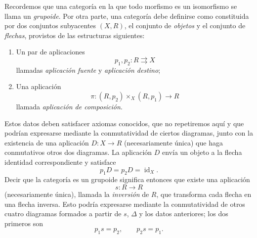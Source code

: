 Recordemos que una categoría en la que todo morfismo es un isomorfismo se
llama un \emph{grupoide}. Por otra parte, una categoría debe definirse como
constituida por dos conjuntos subyacentes $(X,R)$, el conjunto de
\emph{objetos} y el conjunto de \emph{flechas}, provistos de las estructuras
siguientes:
\begin{enumerate}
\item[(i)] Un par de aplicaciones
\[
  p_1,p_2:R\rightrightarrows X
\]
llamadas \emph{aplicación fuente} y \emph{aplicación destino};

\item[(ii)] Una aplicación
\[
  \pi:(R,p_2)\times_X(R,p_1)\longrightarrow R
\]
llamada \emph{aplicación de composición}.
\end{enumerate}
Estos datos deben satisfacer axiomas conocidos, que no repetiremos aquí y que
podrían expresarse mediante la conmutatividad de ciertos diagramas, junto con
la existencia de una aplicación $D:X\to R$ (necesariamente única) que haga
conmutativos otros dos diagramas. La aplicación $D$ envía un objeto a la
flecha identidad correspondiente y satisface
\[
  p_1D=p_2D=\operatorname{id}_X.
\]
Decir que la categoría es un grupoide significa entonces que existe una
aplicación
\[
  s:R\longrightarrow R
\]
(necesariamente única), llamada la \emph{inversión} de $R$, que transforma
cada flecha en una flecha inversa. Esto podría expresarse mediante la
conmutatividad de otros cuatro diagramas formados a partir de $s$, $\Delta$ y
los datos anteriores; los dos primeros son
\[
  p_1s=p_2,\qquad p_2s=p_1.
\]

